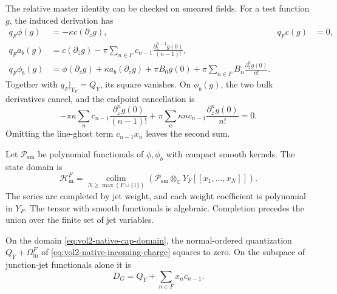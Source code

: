 The relative master identity can be checked on smeared fields. For a
test function \(g\), the induced derivation has
\[
 \begin{aligned}
 q_F\phi(g)&=-\kappa c(\partial_zg),&q_Fc(g)&=0,\\
 q_Fa_b(g)&=c(\partial_{\bar z}g)
       -\pi\sum_{n\in F}c_{n-1}
                         \frac{\partial_z^{n-1}g(0)}{(n-1)!},\\
 q_F\phi_b(g)&=\phi(\partial_{\bar z}g)+\kappa a_b(\partial_zg)
       +\pi B_0g(0)+\pi\sum_{n\in F}B_n\frac{\partial_z^ng(0)}{n!}.
 \end{aligned}
\]
Together with \(q_F|_{Y_F}=Q_Y\), its square vanishes.
On \(\phi_b(g)\), the two bulk derivatives cancel,
and the endpoint cancellation is
\[
 -\pi\kappa\sum_n c_{n-1}\frac{\partial_z^ng(0)}{(n-1)!}
 +\pi\sum_n\kappa nc_{n-1}\frac{\partial_z^ng(0)}{n!}=0.
\]
Omitting the line-ghost term \(c_{n-1}x_n\) leaves the second sum.

Let \(\mathcal P_{\mathrm{sm}}\) be polynomial functionals of
\(\phi,\phi_b\) with compact smooth kernels. The state domain is
\begin{equation}\label{eq:vol2-native-cap-domain}
 \mathcal H^F_{\mathrm{in}}
   =\operatorname*{colim}_{N\geq\max(F\cup\{1\})}
       \left(\mathcal P_{\mathrm{sm}}\otimes_{\mathbb C}
                       Y_F[[x_1,\ldots,x_N]]\right).
\end{equation}
The series are completed by jet weight, and each weight coefficient is
polynomial in \(Y_F\). The tensor with smooth functionals is algebraic.
Completion precedes the union over the finite set of jet variables.

\begin{proposition}\label{prop:vol2-native-cap-complex}
On the domain \eqref{eq:vol2-native-cap-domain}, the normal-ordered
quantization \(Q_Y+\Omega^F_{\mathrm{in}}\) of
\eqref{eq:vol2-native-incoming-charge} squares to zero.
On the subspace of junction-jet functionals alone it is
\begin{equation}\label{eq:vol2-native-cap-differential}
                    D_G=Q_Y+\sum_{n\in F}x_nc_{n-1}.
\end{equation}
\end{proposition}

